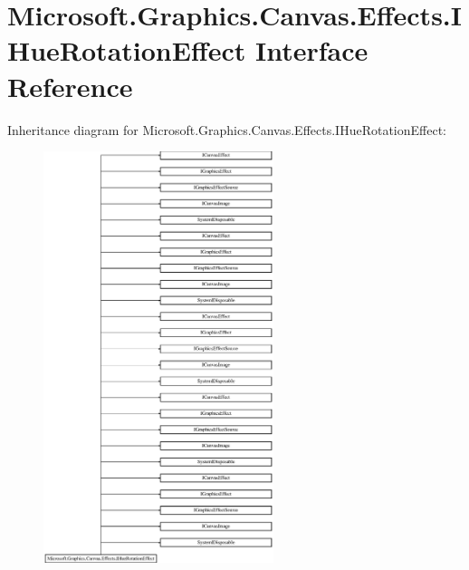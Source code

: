 \hypertarget{interface_microsoft_1_1_graphics_1_1_canvas_1_1_effects_1_1_i_hue_rotation_effect}{}\section{Microsoft.\+Graphics.\+Canvas.\+Effects.\+I\+Hue\+Rotation\+Effect Interface Reference}
\label{interface_microsoft_1_1_graphics_1_1_canvas_1_1_effects_1_1_i_hue_rotation_effect}
Inheritance diagram for Microsoft.\+Graphics.\+Canvas.\+Effects.\+I\+Hue\+Rotation\+Effect\+:\begin{figure}[H]
\begin{center}
\leavevmode
\includegraphics[height=12.000000cm]{interface_microsoft_1_1_graphics_1_1_canvas_1_1_effects_1_1_i_hue_rotation_effect}
\end{center}
\end{figure}
